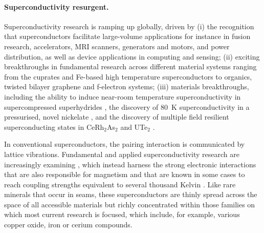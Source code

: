 \paragraph{Superconductivity resurgent.} Superconductivity research is ramping up globally, driven by (i) the recognition that superconductors facilitate large-volume applications for instance in fusion research, accelerators, MRI scanners, generators and motors, and power distribution, as well as device applications in computing and sensing; (ii) exciting breakthroughs in fundamental research across different material systems ranging from the cuprates and Fe-based high temperature superconductors to organics, twisted bilayer graphene and f-electron systems; (iii) materials breakthroughs, including the ability to induce near-room temperature superconductivity %
in supercompressed superhydrides \cite{drozdov19,somayazulu19}, the discovery of \SI{80}{\kelvin} superconductivity in a pressurised, novel nickelate \cite{sun23}, and the discovery of multiple field resilient superconducting states in CeRh$_2$As$_2$ \cite{khim21} and UTe$_2$ \cite{aoki19,ran19}. 



In conventional superconductors, the pairing interaction is communicated by lattice vibrations. Fundamental and applied superconductivity research are increasingly examining , which instead harness the {strong electronic interactions} that are also responsible for magnetism and that are
known in some cases to reach coupling strengths equivalent to several
thousand Kelvin \cite{monthoux07,norman11}. Like rare minerals that occur in seams, these superconductors are thinly spread across the space of all accessible materials but richly concentrated within those families on which most current research is focused, which include, for example, various copper oxide, iron or cerium compounds. 

